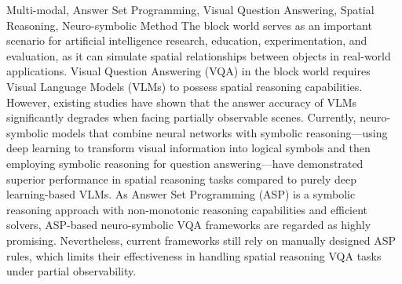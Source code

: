 \begin{englishabstract}{Multi-modal, Answer Set Programming, Visual Question Answering, Spatial Reasoning, Neuro-symbolic Method}
The block world serves as an important scenario for artificial intelligence research, education, experimentation, and evaluation, as it can simulate spatial relationships between objects in real-world applications. Visual Question Answering (VQA) in the block world requires Visual Language Models (VLMs) to possess spatial reasoning capabilities. However, existing studies have shown that the answer accuracy of VLMs significantly degrades when facing partially observable scenes. Currently, neuro-symbolic models that combine neural networks with symbolic reasoning—using deep learning to transform visual information into logical symbols and then employing symbolic reasoning for question answering—have demonstrated superior performance in spatial reasoning tasks compared to purely deep learning-based VLMs. As Answer Set Programming (ASP) is a symbolic reasoning approach with non-monotonic reasoning capabilities and efficient solvers, ASP-based neuro-symbolic VQA frameworks are regarded as highly promising. Nevertheless, current frameworks still rely on manually designed ASP rules, which limits their effectiveness in handling spatial reasoning VQA tasks under partial observability.


\end{englishabstract}
